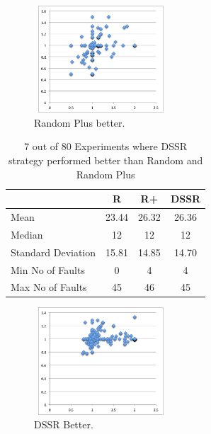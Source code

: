 \documentclass[conference]{IEEEtran}
\begin{document}
\begin{figure}[H]
\centering
\includegraphics[width=5cm,height=4cm]{RandomPlusbetter5.png}
\caption{Random Plus better.}
\label{fig:RandomPlusbetter}
\end{figure}




\begin{table}[H]
\caption{7 out of 80 Experiments where DSSR strategy performed better than Random and Random Plus}
\centering
\begin{tabular}{|l|c|c|c|}
\hline\hline
 				& R			& R+ 			& DSSR \\
\hline
Mean  			&    23.44		&  26.32			&  26.36\\
Median 			&    12 		&  12 			&  12 \\
Standard Deviation 	&    15.81		&  14.85			&  14.70\\
Min No of Faults	&    0			&  4				&  4\\
Max No of Faults 	&    45		&  46				&  45\\
\hline
\end{tabular}
\label{table:DSSRbetter}
\end{table}


\begin{figure}[H]
\centering
\includegraphics[width=5cm,height=4cm]{DSSRbetter5.png}
\caption{DSSR Better.}
\label{fig:DSSRbetter}
\end{figure}



\end{document}
